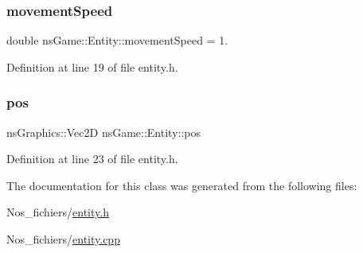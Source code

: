 \subsubsection{\texorpdfstring{movement\+Speed}{movementSpeed}}
{\footnotesize\ttfamily double ns\+Game\+::\+Entity\+::movement\+Speed = 1.\hspace{0.3cm}{\ttfamily [protected]}}



Definition at line 19 of file entity.\+h.

\mbox{\label{classns_game_1_1_entity_a1ad359bb31e86c4971fd96b080ed43c4}} 
\subsubsection{\texorpdfstring{pos}{pos}}
{\footnotesize\ttfamily ns\+Graphics\+::\+Vec2D ns\+Game\+::\+Entity\+::pos}



Definition at line 23 of file entity.\+h.



The documentation for this class was generated from the following files\+:\begin{DoxyCompactItemize}
\item 
Nos\+\_\+fichiers/\hyperlink{entity_8h}{entity.\+h}\item 
Nos\+\_\+fichiers/\hyperlink{entity_8cpp}{entity.\+cpp}\end{DoxyCompactItemize}
